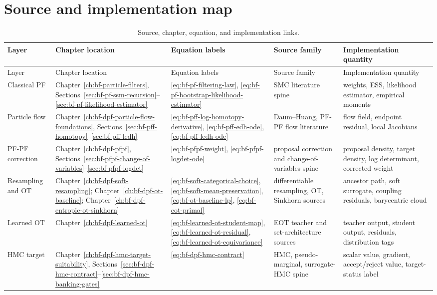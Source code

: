 \section{Source and implementation map}
\label{sec:bf-dpf-debug-source-implementation-map}

\begin{center}
\scriptsize
\begin{longtable}{@{}p{} p{} p{} p{} p{}@{}}
\caption{Source, chapter, equation, and implementation links.}
\label{tab:bf-dpf-debug-source-implementation-map}\\
\toprule
Layer & Chapter location & Equation labels & Source family & Implementation quantity \\
\midrule
\endfirsthead
\toprule
Layer & Chapter location & Equation labels & Source family & Implementation quantity \\
\midrule
\endhead
Classical PF &
Chapter~\ref{ch:bf-particle-filters}, Sections~\ref{sec:bf-pf-ssm-recursion}--\ref{sec:bf-pf-likelihood-estimator} &
\eqref{eq:bf-pf-filtering-law}, \eqref{eq:bf-pf-bootstrap-likelihood-estimator} &
SMC literature spine &
weights, ESS, likelihood estimator, empirical moments \\
Particle flow &
Chapter~\ref{ch:bf-dpf-particle-flow-foundations}, Sections~\ref{sec:bf-pff-homotopy}--\ref{sec:bf-pff-ledh} &
\eqref{eq:bf-pff-log-homotopy-derivative}, \eqref{eq:bf-pff-edh-ode}, \eqref{eq:bf-pff-ledh-ode} &
Daum--Huang, PF-PF flow literature &
flow field, endpoint residual, local Jacobians \\
PF-PF correction &
Chapter~\ref{ch:bf-dpf-pfpf}, Sections~\ref{sec:bf-pfpf-change-of-variables}--\ref{sec:bf-pfpf-logdet} &
\eqref{eq:bf-pfpf-weight}, \eqref{eq:bf-pfpf-logdet-ode} &
proposal correction and change-of-variables spine &
proposal density, target density, log determinant, corrected weight \\
Resampling and OT &
Chapter~\ref{ch:bf-dpf-soft-resampling}; Chapter~\ref{ch:bf-dpf-ot-baseline}; Chapter~\ref{ch:bf-dpf-entropic-ot-sinkhorn} &
\eqref{eq:bf-soft-categorical-choice}, \eqref{eq:bf-soft-mean-preservation}, \eqref{eq:bf-ot-baseline-lp}, \eqref{eq:bf-eot-primal} &
differentiable resampling, OT, Sinkhorn sources &
ancestor path, soft surrogate, coupling residuals, barycentric cloud \\
Learned OT &
Chapter~\ref{ch:bf-dpf-learned-ot} &
\eqref{eq:bf-learned-ot-student-map}, \eqref{eq:bf-learned-ot-residual}, \eqref{eq:bf-learned-ot-equivariance} &
EOT teacher and set-architecture sources &
teacher output, student output, residuals, distribution tags \\
HMC target &
Chapter~\ref{ch:bf-dpf-hmc-target-suitability}, Sections~\ref{sec:bf-dpf-hmc-contract}--\ref{sec:bf-dpf-hmc-banking-gates} &
\eqref{eq:bf-dpf-hmc-contract} &
HMC, pseudo-marginal, surrogate-HMC spine &
scalar value, gradient, accept/reject value, target-status label \\
\bottomrule
\end{longtable}
\end{center}

